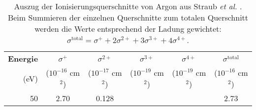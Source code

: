 \begin{table}
    \centering
    \caption[Auszug der Ionisierungsquerschnitte von Argon aus Straub \textit{et al.} \cite{Straub}]{Auszug der Ionisierungsquerschnitte von Argon aus Straub \textit{et al.} \cite{Straub}. Beim Summieren der einzelnen Querschnitte zum totalen Querschnitt werden die Werte entsprechend der Ladung gewichtet:
    $\sigma^{\text{total}} = \sigma^+ + 2\sigma^{2+} + 3\sigma^{3+} + 4\sigma^{4+}$.}
    \label{tab:argon}
    \begin{tabular}{r c c c c c}
        \toprule
        \textbf{Energie} & $\sigma^+$ & $\sigma^{2+}$ & $\sigma^{3+}$ & $\sigma^{4+}$ & $\sigma^{\text{total}}$ \\
        (eV) & ($10^{-16}$ cm$^2$) & ($10^{-17}$ cm$^2$) & ($10^{-19}$ cm$^2$) & ($10^{-19}$ cm$^2$) & ($10^{-16}$ cm$^2$) \\
        \midrule
        50  & 2.70   & 0.128  &        &        & 2.73   \\

\end{tabular}
\end{table}
